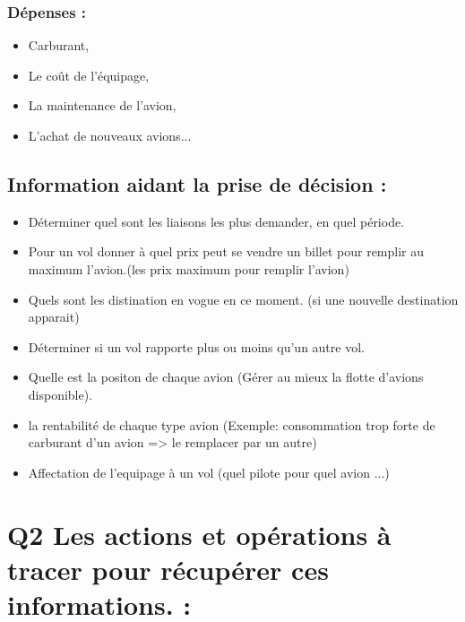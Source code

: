 \documentclass[oneside,13pt,a4paper]{article}
\begin{document}
\subsubsection{Dépenses :}

\begin{itemize}
  \item Carburant,
  \item Le coût de l’équipage,
  \item La maintenance de l'avion,
  \item L'achat de nouveaux avions...
\end{itemize}


\subsection{Information aidant la prise de décision :}

\begin{itemize}
  \item Déterminer quel sont les liaisons les plus demander, en quel période.
  \item Pour un vol donner à quel prix peut se vendre un billet pour remplir au maximum l'avion.(les prix maximum pour remplir l'avion)
  \item Quels sont les distination en vogue en ce moment. (si une nouvelle destination apparait)
  \item Déterminer si un vol rapporte plus ou moins qu'un autre vol.
  \item Quelle est la positon de chaque avion (Gérer au mieux la flotte d'avions disponible).
  \item la rentabilité de chaque type avion (Exemple: consommation trop forte de carburant d'un avion => le remplacer par un autre)
  \item Affectation de l'equipage à un vol (quel pilote pour quel avion ...)
\end{itemize}

\section{Q2 Les actions et opérations à tracer pour récupérer ces informations. : }
\end{document}
